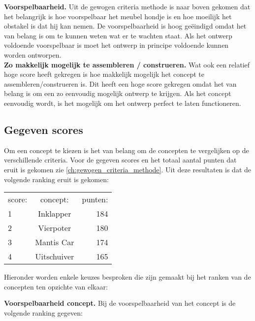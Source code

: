 \textbf{Voorspelbaarheid.} Uit de gewogen criteria methode is naar boven gekomen dat het belangrijk is hoe voorspelbaar het meubel hondje is en hoe moeilijk het obstakel is dat hij kan nemen. De voorspelbaarheid is hoog geëindigd omdat het van belang is om te kunnen weten wat er te wachten staat. Als het ontwerp voldoende voorspelbaar is moet het ontwerp in principe voldoende kunnen worden ontworpen.\\

\textbf{Zo makkelijk mogelijk te assembleren / construeren.} Wat ook een relatief hoge score heeft gekregen is hoe makkelijk mogelijk het concept te assembleren/construeren is. Dit heeft een hoge score gekregen omdat het van belang is om een zo eenvoudig mogelijk ontwerp te krijgen. Als het concept eenvoudig wordt, is het mogelijk om het ontwerp perfect te laten functioneren. \\
\vspace{\baselineskip}



\subsection{Gegeven scores}
\label{se:gegeven_scores}
Om een concept te kiezen is het van belang om de concepten te vergelijken op de verschillende criteria. Voor de gegeven scores en het totaal aantal punten dat eruit is gekomen zie \cref{ch:gewogen_criteria_methode}. Uit deze resultaten is dat de volgende ranking eruit is gekomen: \\

\begin{center}
 \begin{tabular}{| l | c | r | }
  \hline			
  score: & concept: & punten:\\
  1 & Inklapper & 184 \\
  2 & Vierpoter & 180 \\
  3 & Mantis Car & 174 \\
  4 & Uitschuiver & 165 \\
  \hline  
 \end{tabular}
\end{center}
\vspace{\baselineskip}

Hieronder worden enkele keuzes besproken die zijn gemaakt bij het ranken van de concepten ten opzichte van elkaar:\\
\vspace{\baselineskip}

\textbf{Voorspelbaarheid concept.} Bij de voorspelbaarheid van het concept is de volgende ranking gegeven:


